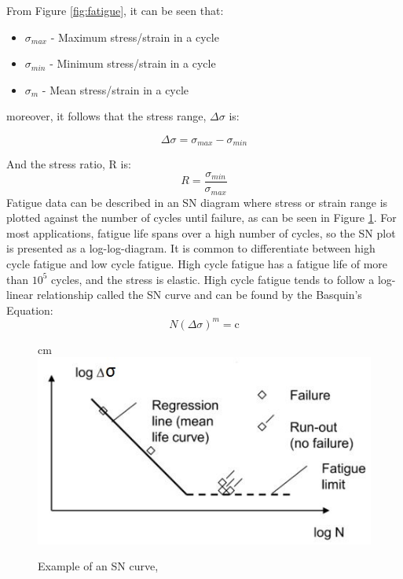From Figure \ref{fig:fatigue}, it can be seen that:
\begin{itemize}
    \item $\sigma_{max}$ -  Maximum stress/strain in a cycle
    \item $\sigma_{min}$ -  Minimum stress/strain in a cycle
    \item $\sigma_{m}$ - Mean stress/strain in a cycle
\end{itemize}

moreover, it follows that the stress range, $\Delta \sigma$ is:

\begin{equation}
    \Delta \sigma =\sigma_{max} - \sigma_{min}
\end{equation}

\noindent And the stress ratio, R is:
\begin{equation}
    R=\frac{\sigma_{min}}{\sigma_{max}}
\end{equation}
Fatigue data can be described in an SN diagram where stress or strain range is plotted against the number of cycles until failure, as can be seen in Figure \ref{fig:sn}. For most applications, fatigue life spans over a high number of cycles, so the SN plot is presented as a log-log-diagram. It is common to differentiate between high cycle fatigue and low cycle fatigue. High cycle fatigue has a fatigue life of more than $10^5$ cycles, and the stress is elastic. High cycle fatigue tends to follow a log-linear relationship called the SN curve and can be found by the Basquin’s Equation:
\begin{equation}
    N(\Delta \sigma)^m = \text{c}
    \label{eq:sn}
\end{equation}
\begin{figure}
     cm 
    \centering
    \includegraphics[scale=1]{figures/sn}
\caption[$\; \:$Example of an SN curve]{Example of an SN curve, \cite{fatigue2016} }
 \label{fig:sn}
\end{figure}

